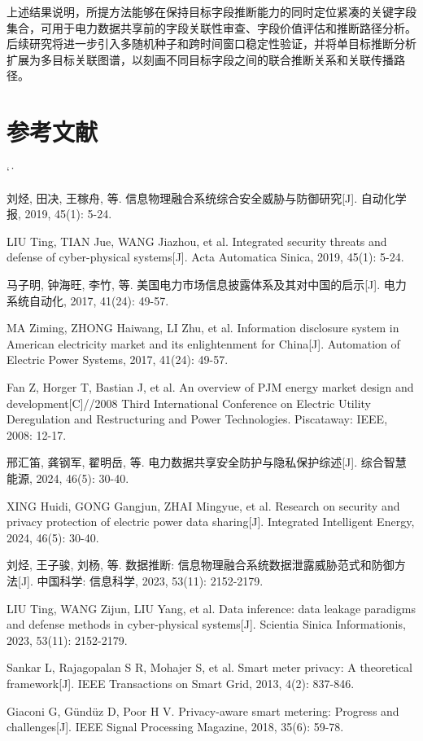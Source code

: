 \documentclass[UTF8,zihao=5,twoside]{ctexart}
\makeatletter
\numberwithin{equation}{section}
\renewcommand{\refname}{参考文献}
\renewenvironment{thebibliography}[1]{%
  \section*{\refname}%
  \small
  \list{[\arabic{enumi}]}{%
    \settowidth\labelwidth{[#1]}%
    \leftmargin\labelwidth
    \advance\leftmargin\labelsep
    \usecounter{enumi}}
  \sloppy\clubpenalty4000\widowpenalty4000\sfcode`\.\ \@m
}{\def\@noitemerr{\@latex@warning{Empty `thebibliography' environment}}\endlist}
\makeatother
\begin{document}
上述结果说明，所提方法能够在保持目标字段推断能力的同时定位紧凑的关键字段集合，可用于电力数据共享前的字段关联性审查、字段价值评估和推断路径分析。后续研究将进一步引入多随机种子和跨时间窗口稳定性验证，并将单目标推断分析扩展为多目标关联图谱，以刻画不同目标字段之间的联合推断关系和关联传播路径。

\balance
\begin{thebibliography}{99}
刘烃, 田决, 王稼舟, 等. 信息物理融合系统综合安全威胁与防御研究[J]. 自动化学报, 2019, 45(1): 5-24.

LIU Ting, TIAN Jue, WANG Jiazhou, et al. Integrated security threats and defense of cyber-physical systems[J]. Acta Automatica Sinica, 2019, 45(1): 5-24.

马子明, 钟海旺, 李竹, 等. 美国电力市场信息披露体系及其对中国的启示[J]. 电力系统自动化, 2017, 41(24): 49-57.

MA Ziming, ZHONG Haiwang, LI Zhu, et al. Information disclosure system in American electricity market and its enlightenment for China[J]. Automation of Electric Power Systems, 2017, 41(24): 49-57.

Fan Z, Horger T, Bastian J, et al. An overview of PJM energy market design and development[C]//2008 Third International Conference on Electric Utility Deregulation and Restructuring and Power Technologies. Piscataway: IEEE, 2008: 12-17.

邢汇笛, 龚钢军, 翟明岳, 等. 电力数据共享安全防护与隐私保护综述[J]. 综合智慧能源, 2024, 46(5): 30-40.

XING Huidi, GONG Gangjun, ZHAI Mingyue, et al. Research on security and privacy protection of electric power data sharing[J]. Integrated Intelligent Energy, 2024, 46(5): 30-40.

刘烃, 王子骏, 刘杨, 等. 数据推断: 信息物理融合系统数据泄露威胁范式和防御方法[J]. 中国科学: 信息科学, 2023, 53(11): 2152-2179.

LIU Ting, WANG Zijun, LIU Yang, et al. Data inference: data leakage paradigms and defense methods in cyber-physical systems[J]. Scientia Sinica Informationis, 2023, 53(11): 2152-2179.

Sankar L, Rajagopalan S R, Mohajer S, et al. Smart meter privacy: A theoretical framework[J]. IEEE Transactions on Smart Grid, 2013, 4(2): 837-846.

Giaconi G, Gündüz D, Poor H V. Privacy-aware smart metering: Progress and challenges[J]. IEEE Signal Processing Magazine, 2018, 35(6): 59-78.


\end{thebibliography}
\end{document}
